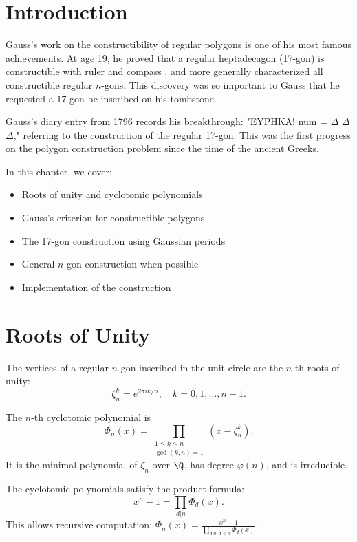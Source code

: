\section{Introduction}

Gauss's work on the constructibility of regular polygons is one of his most famous achievements. At age 19, he proved that a regular heptadecagon  (17-gon) is constructible  with ruler and compass , and more generally characterized all constructible regular $n$-gons. This discovery was so important to Gauss that he requested a 17-gon be inscribed on his tombstone.

Gauss's diary entry from 1796 records his breakthrough: "EYPHKA! num = $\Delta$ $\Delta$ $\Delta$," referring to the construction of the regular 17-gon. This was the first progress on the polygon construction problem since the time of the ancient Greeks.

In this chapter, we cover:
\begin{itemize}
    \item Roots of unity and cyclotomic polynomials
    \item Gauss's criterion for constructible polygons
    \item The 17-gon construction using Gaussian periods 
    \item General $n$-gon construction when possible
    \item Implementation of the construction
\end{itemize}

\section{Roots of Unity}

The vertices of a regular $n$-gon inscribed in the unit circle are the $n$-th roots of unity:
\[
\zeta_n^k = e^{2\pi i k / n}, \quad k = 0, 1, \ldots, n-1.
\]

\begin{definition}
The $n$-th cyclotomic polynomial is
\[
\Phi_n(x) = \prod_{\substack{1 \le k \le n \\ \gcd(k,n)=1}} (x - \zeta_n^k).
\]
It is the minimal polynomial of $\zeta_n$ over $\Q$, has degree $\varphi(n)$, and is irreducible.
\end{definition}

The cyclotomic polynomials satisfy the product formula:
\[
x^n - 1 = \prod_{d|n} \Phi_d(x).
\]
This allows recursive computation: $\Phi_n(x) = \frac{x^n - 1}{\prod_{d|n, d<n} \Phi_d(x)}$.


